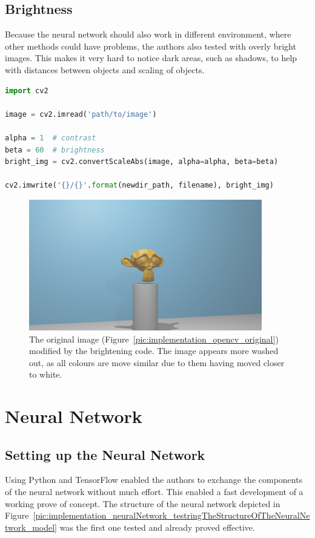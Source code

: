 \subsection{Brightness}
Because the neural network should also work in different environment, where other methods could have problems, the authors also tested with overly bright images. This makes it very hard to notice dark areas, such as shadows, to help with distances between objects and scaling of objects.

\begin{lstlisting}[language=python]
import cv2

image = cv2.imread('path/to/image')

alpha = 1  # contrast
beta = 60  # brightness
bright_img = cv2.convertScaleAbs(image, alpha=alpha, beta=beta)

cv2.imwrite('{}/{}'.format(newdir_path, filename), bright_img)
\end{lstlisting}

\begin{figure}[h!]
	\centering
	\includegraphics[width=4in]{img/implementation_opencv_brightness.jpg}
	\caption{The original image (Figure~\ref{pic:implementation_opencv_original}) modified by the brightening code. The image appears more washed out, as all colours are move similar due to them having moved closer to white.}
	\label{pic:implementation_opencv_brightness}
\end{figure}

\section{Neural Network}
\subsection{Setting up the Neural Network}
Using Python and TensorFlow enabled the authors to exchange the components of the neural network without much effort. This enabled a fast development of a working prove of concept. The structure of the neural network depicted in Figure~\ref{pic:implementation_neuralNetwork_testringTheStructureOfTheNeuralNetwork_model} was the first one tested and already proved effective.

